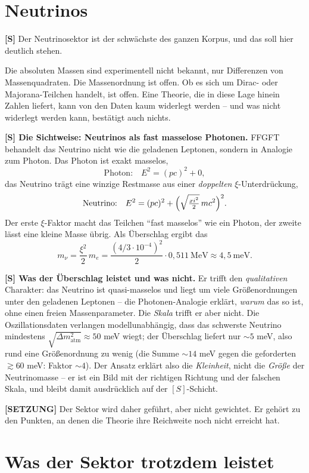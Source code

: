 \section{Neutrinos}

\textbf{[S]} Der Neutrinosektor ist der schwächste des ganzen Korpus, und das
soll hier deutlich stehen.

Die absoluten Massen sind experimentell nicht bekannt, nur Differenzen von
Massenquadraten. Die Massenordnung ist offen. Ob es sich um Dirac- oder
Majorana-Teilchen handelt, ist offen. Eine Theorie, die in diese Lage hinein
Zahlen liefert, kann von den Daten kaum widerlegt werden -- und was nicht
widerlegt werden kann, bestätigt auch nichts.

\textbf{[S] Die Sichtweise: Neutrinos als fast masselose Photonen.} FFGFT
behandelt das Neutrino nicht wie die geladenen Leptonen, sondern in Analogie zum
Photon. Das Photon ist exakt masselos,
\[
  \text{Photon:}\quad E^2 = (pc)^2 + 0,
\]
das Neutrino trägt eine winzige Restmasse aus einer \emph{doppelten}
$\xi$-Unterdrückung,
\[
  \text{Neutrino:}\quad E^2 = (pc)^2 + \Bigl(\sqrt{\tfrac{\xi^2}{2}}\,mc^2\Bigr)^2 .
\]
Der erste $\xi$-Faktor macht das Teilchen \enquote{fast masselos} wie ein Photon,
der zweite lässt eine kleine Masse übrig. Als Überschlag ergibt das
\[
  m_\nu = \frac{\xi^2}{2}\,m_e
        = \frac{(4/3\cdot10^{-4})^2}{2}\cdot 0{,}511\ \text{MeV}
        \approx 4{,}5\ \text{meV}.
\]

\textbf{[S] Was der Überschlag leistet und was nicht.} Er trifft den
\emph{qualitativen} Charakter: das Neutrino ist quasi-masselos und liegt um viele
Größenordnungen unter den geladenen Leptonen -- die Photonen-Analogie erklärt,
\emph{warum} das so ist, ohne einen freien Massenparameter. Die \emph{Skala}
trifft er aber nicht. Die Oszillationsdaten verlangen modellunabhängig, dass das
schwerste Neutrino mindestens $\sqrt{\Delta m^2_\text{atm}} \approx 50$ meV wiegt;
der Überschlag liefert nur $\sim5$ meV, also rund eine Größenordnung zu wenig
(die Summe $\sim14$ meV gegen die geforderten $\gtrsim60$ meV: Faktor $\sim4$).
Der Ansatz erklärt also die \emph{Kleinheit}, nicht die \emph{Größe} der
Neutrinomasse -- er ist ein Bild mit der richtigen Richtung und der falschen
Skala, und bleibt damit ausdrücklich auf der $[S]$-Schicht.

\textbf{[SETZUNG]} Der Sektor wird daher geführt, aber nicht gewichtet. Er
gehört zu den Punkten, an denen die Theorie ihre Reichweite noch nicht erreicht
hat.

\section{Was der Sektor trotzdem leistet}

